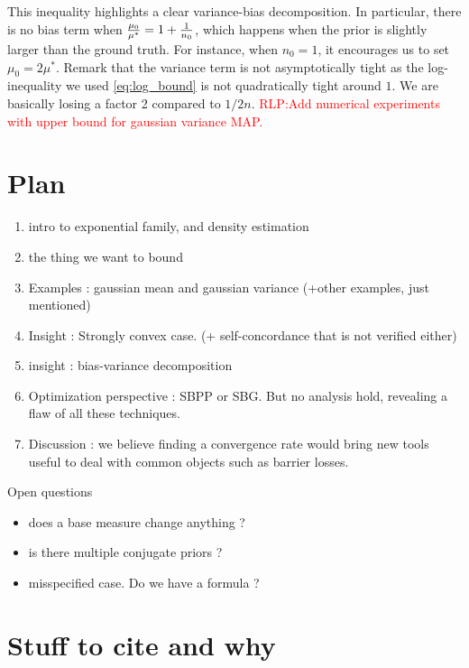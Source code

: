 \documentclass[twoside]{article}
\newcommand{\RLP}[1]{\textcolor{red}{RLP:#1}}
\begin{document}
This inequality highlights a clear variance-bias decomposition.
In particular, there is no bias term when $\frac{\mu_0}{\mu^*} =1 + \frac{1}{n_0} $, which happens when the prior is slightly larger than the ground truth.  For instance, when $n_0=1$, it encourages us to set $\mu_0 = 2 \mu^*$.
Remark that the variance term is not asymptotically tight as the log-inequality we used \eqref{eq:log_bound} is not quadratically tight around $1$. We are basically losing a factor 2 compared to $1/2n$.
\RLP{Add numerical experiments with upper bound for gaussian variance MAP.}







\clearpage
\section{Plan}

\begin{enumerate}
	\item intro to exponential family, and density estimation
	\item the thing we want to bound
	\item Examples : gaussian mean and gaussian variance (+other examples, just mentioned)
	\item Insight : Strongly convex case. (+ self-concordance that is not verified either)
	\item insight : bias-variance decomposition
	\item Optimization perspective : SBPP or SBG. But no analysis hold, revealing a flaw of all these techniques.
	\item Discussion : we believe finding a convergence rate would bring new tools useful to deal with common objects such as barrier losses.
\end{enumerate}

Open questions
\begin{itemize}
	\item does a base measure change anything ?
	\item is there multiple conjugate priors ?
	\item misspecified case. Do we have a   formula ?
\end{itemize}


\section{Stuff to cite and why }
\end{document}
